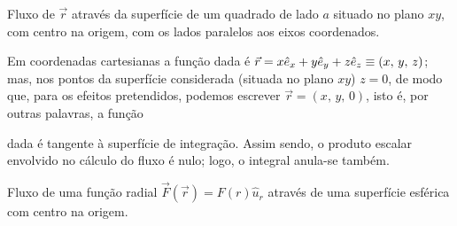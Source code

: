 \begin{examples}
\item Fluxo de $\vec r$ através da superfície de um quadrado de lado $a$ situado
no plano $xy$, com centro na origem, com os lados paralelos aos eixos
coordenados.\\
\hfill
\begin{minipage}[t]{0.85\linewidth}
Em coordenadas cartesianas a função dada é 
$\vec r=x\he_x+y\he_y+z\he_z\equiv(x,\,y,\,z)$; mas, nos pontos da superfície
considerada (situada no plano $xy$) $z=0$, de modo que, para os efeitos pretendidos, podemos
escrever $\vec r=(x,\,y,\,0)$, isto é, por outras palavras, a função\linebreak 
\vspace{-0.7\baselineskip}
\end{minipage}
dada é tangente à superfície de integração. Assim sendo, o produto escalar
envolvido no cálculo do fluxo é nulo; logo, o integral anula-se também.
\item
    Fluxo de uma função radial $\vec F(\vec r)=F(r)\hat u_r$ através de uma
    superfície esférica com centro na origem.\\
\end{examples}
